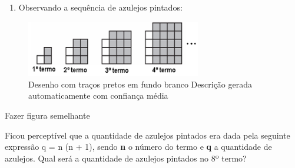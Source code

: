 \begin{escolha}
\begin{boxmedio}
\begin{boxmedio}
{\begin{boxpeq}
\begin{boxpeq}
{\begin{boxpeq}
\begin{boxmedio}
\begin{boxmedio}
\begin{boxpeq}
\begin{boxmedio}
\begin{boxpeq}
\begin{boxpeq}
\begin{boxpeq}
\begin{boxpeq}
\begin{boxmedio}
{\begin{boxmedio}
\begin{boxmedio}
\begin{boxpeq}
\begin{boxmedio}
\begin{boxpeq}
\begin{boxpeq}
\begin{boxpeq}
\begin{escolha}
{\begin{boxmedio}
\begin{boxpeq}
\begin{boxpeq}
\begin{boxpeq}
\begin{boxpeq}
\begin{boxpeq}
\begin{boxmedio}
\begin{boxpeq}
\begin{boxpeq}
\begin{boxpeq}
{\begin{boxpeq}
\begin{boxmedio}
\begin{boxpeq}
\begin{boxpeq}
\begin{boxpeq}
{\begin{boxpeq}
\begin{boxmedio}
{\begin{boxpeq}
\begin{boxpeq}
\begin{boxmedio}
\begin{boxmedio}
\begin{boxpeq}
\begin{boxpeq}
{\begin{boxpeq}
\begin{boxpeq}
\begin{boxpeq}
\begin{boxpeq}
\begin{boxpeq}
\begin{escolha}
\begin{escolha}
{\begin{boxmedio}
\begin{boxpeq}
\begin{q°}
\begin{boxmedio}
\begin{boxpeq}
\begin{boxpeq}
\begin{boxmedio}
\begin{boxmedio}
\begin{boxmedio}
\begin{boxmedio}
{\begin{escolha}
\begin{escolha}
\begin{escolha}
\begin{escolha}
\begin{escolha}
\begin{escolha}
{\begin{enumerate}
\num{\arabic{enumi}.}
\setcounter{enumi}{5}
\tightlist
\item
  Observando a sequência de azulejos pintados:
\end{enumerate}

\begin{figure}
\centering
\includegraphics[width=3in,height=0.96526in]{./_SAEB_9_MAT/media/image270.png}
\caption{Desenho com traços pretos em fundo branco Descrição gerada
automaticamente com confiança média}
\end{figure}

Fazer figura semelhante

Ficou perceptível que a quantidade de azulejos pintados era dada pela
seguinte expressão q = n \cdot (n + 1), sendo \textbf{n} o número do termo e
\textbf{q} a quantidade de azulejos. Qual será a quantidade de azulejos
pintados no 8º termo?

}
\end{escolha}
\end{escolha}
\end{escolha}
\end{escolha}
\end{escolha}
\end{escolha}}
\end{boxmedio}
\end{boxmedio}
\end{boxmedio}
\end{boxmedio}
\end{boxpeq}
\end{boxpeq}
\end{boxmedio}
\end{q°}
\end{boxpeq}
\end{boxmedio}}
\end{escolha}
\end{escolha}
\end{boxpeq}
\end{boxpeq}
\end{boxpeq}
\end{boxpeq}
\end{boxpeq}}
\end{boxpeq}
\end{boxpeq}
\end{boxmedio}
\end{boxmedio}
\end{boxpeq}
\end{boxpeq}}
\end{boxmedio}
\end{boxpeq}}
\end{boxpeq}
\end{boxpeq}
\end{boxpeq}
\end{boxmedio}
\end{boxpeq}}
\end{boxpeq}
\end{boxpeq}
\end{boxpeq}
\end{boxmedio}
\end{boxpeq}
\end{boxpeq}
\end{boxpeq}
\end{boxpeq}
\end{boxpeq}
\end{boxmedio}}
\end{escolha}
\end{boxpeq}
\end{boxpeq}
\end{boxpeq}
\end{boxmedio}
\end{boxpeq}
\end{boxmedio}
\end{boxmedio}}
\end{boxmedio}
\end{boxpeq}
\end{boxpeq}
\end{boxpeq}
\end{boxpeq}
\end{boxmedio}
\end{boxpeq}
\end{boxmedio}
\end{boxmedio}
\end{boxpeq}}
\end{boxpeq}
\end{boxpeq}}
\end{boxmedio}
\end{boxmedio}
\end{escolha}
